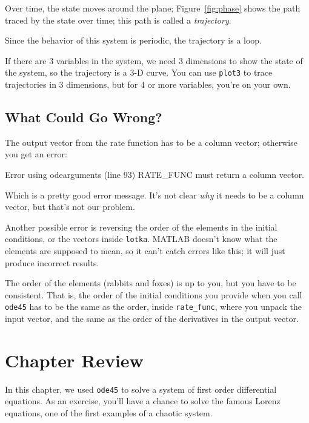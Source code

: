 Over time, the state moves around the plane; Figure~\ref{fig:phase} shows
the path traced by the state over time; this path
is called a {\em trajectory}.

Since the behavior of this system is periodic, the trajectory is a loop.

If there are 3 variables in the system, we need 3 dimensions to show
the state of the system, so the trajectory is a 3-D curve.
You can use {\tt plot3} to trace trajectories in 3 dimensions,
but for 4 or more variables, you're on your own.



\subsection{What Could Go Wrong?}

The output vector from the rate function has to be a column vector; otherwise you get an error:

\begin{code}
Error using odearguments (line 93)
RATE_FUNC must return a column vector.
\end{code}

Which is a pretty good error message.  It's not clear {\em why}
it needs to be a column vector, but that's not our problem.


Another possible error is reversing the order of the elements in the
initial conditions, or the vectors inside {\tt lotka}.  MATLAB
doesn't know what the elements are supposed to mean, so it can't catch
errors like this; it will just produce incorrect results.

The order of the elements (rabbits and foxes) is up to you, but
you have to be consistent.  That is, the order of the initial conditions you
provide when you call {\tt ode45} has to be the same as the order,
inside \verb"rate_func", where you unpack the input vector, and the
same as the order of the derivatives in the output vector.

\section{Chapter Review}

In this chapter, we used {\tt ode45} to solve a system of first order differential equations.
As an exercise, you'll have a chance to solve the famous Lorenz equations, one of the first examples of a chaotic system.

